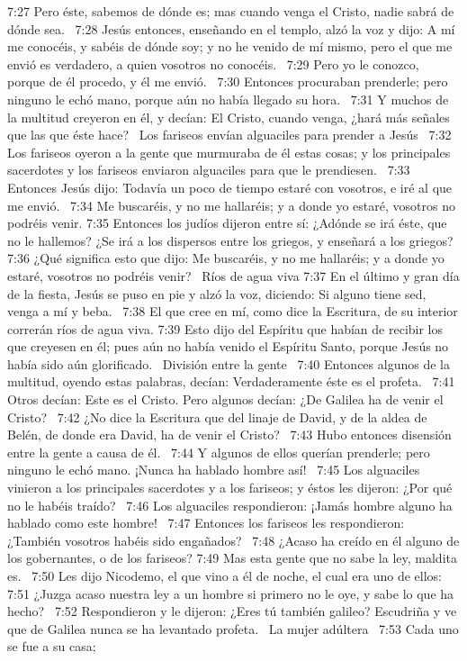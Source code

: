 7:27 Pero éste, sabemos de dónde es; mas cuando venga el Cristo, nadie sabrá de dónde sea.  
7:28 Jesús entonces, enseñando en el templo, alzó la voz y dijo: A mí me conocéis, y sabéis de dónde soy; y no he venido de mí mismo, pero el que me envió es verdadero, a quien vosotros no conocéis.  
7:29 Pero yo le conozco, porque de él procedo, y él me envió.  
7:30 Entonces procuraban prenderle; pero ninguno le echó mano, porque aún no había llegado su hora.  
7:31 Y muchos de la multitud creyeron en él, y decían: El Cristo, cuando venga, ¿hará más señales que las que éste hace?  
Los fariseos envían alguaciles para prender a Jesús  
7:32 Los fariseos oyeron a la gente que murmuraba de él estas cosas; y los principales sacerdotes y los fariseos enviaron alguaciles para que le prendiesen.  
7:33 Entonces Jesús dijo: Todavía un poco de tiempo estaré con vosotros, e iré al que me envió.  
7:34 Me buscaréis, y no me hallaréis; y a donde yo estaré, vosotros no podréis venir. 
7:35 Entonces los judíos dijeron entre sí: ¿Adónde se irá éste, que no le hallemos? ¿Se irá a los dispersos entre los griegos, y enseñará a los griegos?  
7:36 ¿Qué significa esto que dijo: Me buscaréis, y no me hallaréis; y a donde yo estaré, vosotros no podréis venir?  
Ríos de agua viva 
7:37 En el último y gran día de la fiesta, Jesús se puso en pie y alzó la voz, diciendo: Si alguno tiene sed, venga a mí y beba.  
7:38 El que cree en mí, como dice la Escritura, de su interior correrán ríos de agua viva. 
7:39 Esto dijo del Espíritu que habían de recibir los que creyesen en él; pues aún no había venido el Espíritu Santo, porque Jesús no había sido aún glorificado.  
División entre la gente  
7:40 Entonces algunos de la multitud, oyendo estas palabras, decían: Verdaderamente éste es el profeta.  
7:41 Otros decían: Este es el Cristo. Pero algunos decían: ¿De Galilea ha de venir el Cristo?  
7:42 ¿No dice la Escritura que del linaje de David, y de la aldea de Belén, de donde era David, ha de venir el Cristo?  
7:43 Hubo entonces disensión entre la gente a causa de él.  
7:44 Y algunos de ellos querían prenderle; pero ninguno le echó mano. 
¡Nunca ha hablado hombre así!  
7:45 Los alguaciles vinieron a los principales sacerdotes y a los fariseos; y éstos les dijeron: ¿Por qué no le habéis traído?  
7:46 Los alguaciles respondieron: ¡Jamás hombre alguno ha hablado como este hombre!  
7:47 Entonces los fariseos les respondieron: ¿También vosotros habéis sido engañados?  
7:48 ¿Acaso ha creído en él alguno de los gobernantes, o de los fariseos? 
7:49 Mas esta gente que no sabe la ley, maldita es.  
7:50 Les dijo Nicodemo, el que vino a él de noche, el cual era uno de ellos:  
7:51 ¿Juzga acaso nuestra ley a un hombre si primero no le oye, y sabe lo que ha hecho?  
7:52 Respondieron y le dijeron: ¿Eres tú también galileo? Escudriña y ve que de Galilea nunca se ha levantado profeta.  
La mujer adúltera  
7:53 Cada uno se fue a su casa;  
